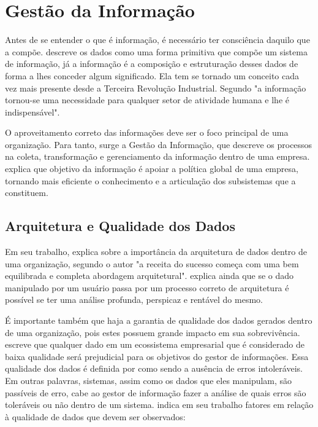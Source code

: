 \section{Gestão da Informação}
\label{sec:gesinfo}

Antes de se entender o que é informação, é necessário ter consciência daquilo que a compõe.
\cite{siqueira2005gestao} descreve os dados como uma forma primitiva que compõe um sistema de informação, já a informação é a composição e estruturação desses dados de forma a lhes conceder algum significado. Ela tem se tornado um conceito cada vez mais presente desde a Terceira Revolução Industrial. Segundo \cite{braga2000gestao} "a informação tornou-se uma necessidade para qualquer setor de atividade humana e lhe é indispensável".

O aproveitamento correto das informações deve ser o foco principal de uma organização. Para tanto, surge a Gestão da Informação, que descreve os processos na coleta, transformação e gerenciamento da informação dentro de uma empresa. \cite{braga2000gestao} explica que objetivo da informação é apoiar a política global de uma empresa, tornando mais eficiente o conhecimento e a articulação dos subsistemas que a constituem.

\subsection{Arquitetura e Qualidade dos Dados}

Em seu trabalho, \cite{mcknight2013information} explica sobre a importância da arquitetura de dados dentro de uma organização, segundo o autor "a receita do sucesso começa com uma bem equilibrada e completa abordagem arquitetural". \cite{mcknight2013information} explica ainda que se o dado manipulado por um usuário passa por um processo correto de arquitetura é possível se ter uma análise profunda, perspicaz e rentável do mesmo.


É importante também que haja a garantia de qualidade dos dados gerados dentro de uma organização, pois estes possuem grande impacto em sua sobrevivência. \cite{mcknight2013information}  escreve que qualquer dado em um ecossistema empresarial que é considerado de baixa qualidade será prejudicial para os objetivos do gestor de informações. Essa qualidade dos dados é definida por \cite{mcknight2013information} como sendo a ausência de erros intoleráveis. Em outras palavras, sistemas, assim como os dados que eles manipulam, são passíveis de erro, cabe ao gestor de informação fazer a análise de quais erros são toleráveis ou não dentro de um sistema. \cite{mcknight2013information} indica em seu trabalho fatores em relação à qualidade de dados que devem ser observados:

